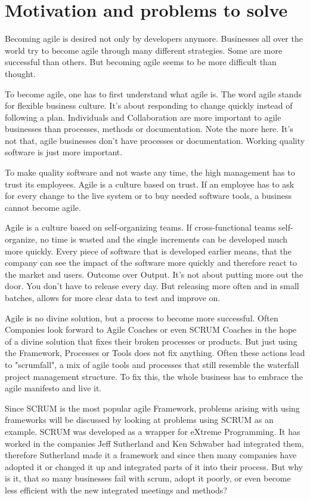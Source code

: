 % 
\section*{Motivation and problems to solve}

Becoming agile is desired not only by developers anymore. Businesses all over the world try to become agile through many different strategies. Some are more successful than others. But becoming agile seems to be more difficult than thought.

To become agile, one has to first understand what agile is. The word agile stands for flexible business culture. It's about responding to change quickly instead of following a plan. Individuals and Collaboration are more important to agile businesses than processes, methods or documentation. Note the more here. It's not that, agile businesses don't have processes or documentation. Working quality software is just more important. 

To make quality software and not waste any time, the high management has to trust its employees. Agile is a culture based on trust. If an employee has to ask for every change to the live system or to buy needed software tools, a business cannot become agile.

Agile is a culture based on self-organizing teams. If cross-functional teams self-organize, no time is wasted and the single increments can be developed much more quickly. Every piece of software that is developed earlier means, that the company can see the impact of the software more quickly and therefore react to the market and users. Outcome over Output. It's not about putting more out the door. You don't have to release every day. But releasing more often and in small batches, allows for more clear data to test and improve on.

Agile is no divine solution, but a process to become more successful. Often Companies look forward to Agile Coaches or even SCRUM Coaches in the hope of a divine solution that fixes their broken processes or products. But just using the Framework, Processes or Tools does not fix anything. Often these actions lead to "scrumfall", a mix of agile tools and processes that still resemble the waterfall project management structure. To fix this, the whole business has to embrace the agile manifesto and live it.

Since SCRUM is the most popular agile Framework, problems arising with using frameworks will be discussed by looking at problems using SCRUM as an example. SCRUM was developed as a wrapper for eXtreme Programming. It has worked in the companies Jeff Sutherland and Ken Schwaber had integrated them, therefore Sutherland made it a framework and since then many companies have adopted it or changed it up and integrated parts of it into their process. But why is it, that so many businesses fail with scrum, adopt it poorly, or even become less efficient with the new integrated meetings and methods?

